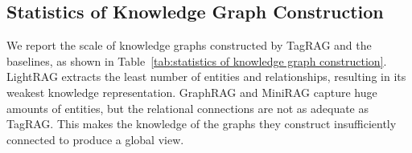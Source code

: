 \documentclass[11pt]{article}
\begin{document}










\subsection{Statistics of Knowledge Graph Construction}
We report the scale of knowledge graphs constructed by TagRAG and the baselines, as shown in Table~\ref{tab:statistics of knowledge graph construction}.
LightRAG extracts the least number of entities and relationships, resulting in its weakest knowledge representation.
GraphRAG and MiniRAG capture huge amounts of entities, but the relational connections are not as adequate as TagRAG. This makes the knowledge of the graphs they construct insufficiently connected to produce a global view.
\end{document}
